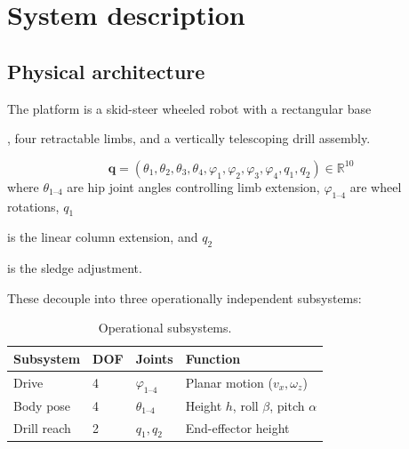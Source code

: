 \documentclass[11pt,a4paper]{article}
\begin{document}
\section{System description}
\label{sec:system-description}

\subsection{Physical architecture}

The platform is a skid-steer wheeled robot with a rectangular base 

, four retractable limbs, and a vertically telescoping drill assembly.

%
\begin{equation}
    \mathbf{q} = (\theta_1, \theta_2, \theta_3, \theta_4, \varphi_1, \varphi_2, \varphi_3, \varphi_4, q_1, q_2) \in \mathbb{R}^{10}
\end{equation}
%
where $\theta_{1\text{--}4}$ are hip joint angles controlling limb extension, 
$\varphi_{1\text{--}4}$ are wheel rotations, 
$q_1$

is the linear column extension, and $q_2$

is the sledge adjustment.

These decouple into three operationally independent subsystems:

\begin{table}[htbp]
    \centering
    \caption{Operational subsystems.}
    \label{tab:subsystems}
    \begin{tabular}{@{}llll@{}}
        \toprule
        Subsystem & DOF & Joints & Function \\
        \midrule
        Drive       & 4 & $\varphi_{1\text{--}4}$ & Planar motion ($v_x, \omega_z$) \\
        Body pose   & 4 & $\theta_{1\text{--}4}$  & Height $h$, roll $\beta$, pitch $\alpha$ \\
        Drill reach & 2 & $q_1, q_2$              & End-effector height \\
        \bottomrule
    \end{tabular}
\end{table}
\end{document}
